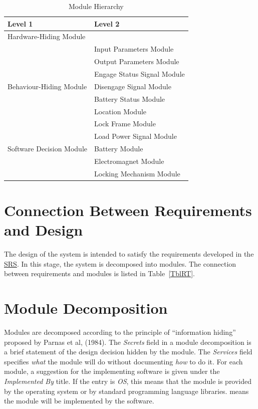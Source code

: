 \documentclass[12pt, titlepage]{article}
\begin{document}
\begin{table}[h!]
\centering
\begin{tabular}{p{} p{}}
\toprule
\textbf{Level 1} & \textbf{Level 2}\\
\midrule

{Hardware-Hiding Module} & ~ \\
\midrule

\multirow{7}{0.3\textwidth}{Behaviour-Hiding Module} & Input Parameters Module \\
& Output Parameters Module \\
& Engage Status Signal Module \\
& Disengage Signal Module \\
& Battery Status Module \\
& Location Module \\ 
& Lock Frame Module \\
\midrule

\multirow{3}{0.3\textwidth}{Software Decision Module} & Load Power Signal Module \\
& Battery Module \\
& Electromagnet Module \\
& Locking Mechanism Module \\
\bottomrule

\end{tabular}
\caption{Module Hierarchy}
\label{TblMH}
\end{table}

\section{Connection Between Requirements and Design} \label{SecConnection}

The design of the system is intended to satisfy the requirements developed in
the \href{https://github.com/NevoAbigail/Capstone/blob/main/docs/SRS/SRS.pdf}{SRS}. In this stage, the system is decomposed into modules. The connection
between requirements and modules is listed in Table~\ref{TblRT}.

\section{Module Decomposition} \label{SecMD}

Modules are decomposed according to the principle of ``information hiding''
proposed by Parnas et al, (1984). The \emph{Secrets} field in a module
decomposition is a brief statement of the design decision hidden by the
module. The \emph{Services} field specifies \emph{what} the module will do
without documenting \emph{how} to do it. For each module, a suggestion for the
implementing software is given under the \emph{Implemented By} title. If the
entry is \emph{OS}, this means that the module is provided by the operating
system or by standard programming language libraries.  \emph{\progname{}} means the
module will be implemented by the \progname{} software.
\end{document}
